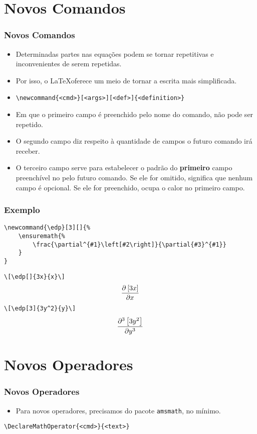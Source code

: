 \documentclass[brazilian]{beamer}
\begin{document}
\section{Novos Comandos}
\begin{frame}[fragile]
    \frametitle{Novos Comandos}

    \begin{itemize}
        \item Determinadas partes nas equações podem se tornar repetitivas e inconvenientes de serem repetidas. 
        \item Por isso, o \LaTeX oferece um meio de tornar a escrita mais simplificada.
        \item \lstinline[style=myStyleLatex]!\newcommand{<cmd>}[<args>][<def>]{<definition>}!
        \item Em que o primeiro campo é preenchido pelo nome do comando, não pode ser repetido.
        \item O segundo campo diz respeito à quantidade de campos o futuro comando irá receber. 
        \item O terceiro campo serve para estabelecer o padrão do \textbf{primeiro} campo preenchível no pelo futuro comando. Se ele for omitido, significa que nenhum campo é opcional. Se ele for preenchido, ocupa o calor no primeiro campo. 
    \end{itemize}

\end{frame}
\begin{frame}[fragile]
    \frametitle{Exemplo}
\footnotesize
\begin{lstlisting}[style=myStyleLatex]
\newcommand{\edp}[3][]{%
    \ensuremath{%
        \frac{\partial^{#1}\left[#2\right]}{\partial{#3}^{#1}}
    }
}
\end{lstlisting}
\lstinline[style=myStyleLatex]!\[\edp[]{3x}{x}\]!
\[\edp[]{3x}{x}\]
\lstinline[style=myStyleLatex]!\[\edp[3]{3y^2}{y}\]!
\[\edp[3]{3y^2}{y}\]

\end{frame}


\section{Novos Operadores}
\begin{frame}[fragile]
    \frametitle{Novos Operadores}

    \begin{itemize}
        \item Para novos operadores, precisamos do pacote \texttt{amsmath}, no mínimo.
    \end{itemize}
\begin{lstlisting}[style=myStyleLatex]
\DeclareMathOperator{<cmd>}{<text>}
\end{lstlisting}    
\end{frame}
\end{document}
